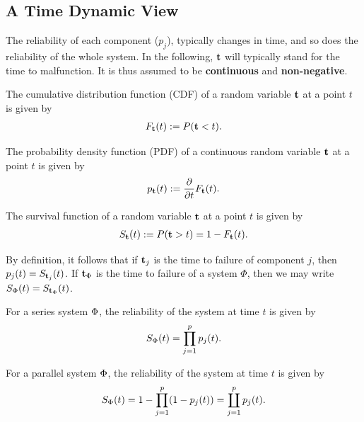 \subsection{A Time Dynamic View}
The reliability of each component ($p_j$), typically changes in time, and so does the reliability of the whole system.
In the following, $\mathbf{t}$ will typically stand for the time to malfunction. It is thus assumed to be \textbf{continuous} and \textbf{non-negative}.


\begin{definition}[CDF]
The cumulative distribution function (CDF) of a random variable $\mathbf{t}$ at a point $t$  is given by
\begin{align}
	F_{\mathbf{t}} (t):= P(\mathbf{t}<t).
\end{align}
\end{definition}

\begin{definition}[PDF]
The probability density function (PDF) of a continuous random variable $\mathbf{t}$ at a point $t$ is given by 
\begin{align}
	p_{\mathbf{t}} (t):= \frac{\partial}{\partial t}F_{\mathbf{t}} (t).
\end{align}
\end{definition}


\begin{definition}
The survival function of a random variable $\mathbf{t}$ at a point $t$ is given by 
\begin{align}
	S_{\mathbf{t}} (t):= P(\mathbf{t}>t)=1-F_{\mathbf{t}} (t).
\end{align}
\end{definition}
By definition, it follows that if $\mathbf{t}_j$ is the time to failure of component $j$, then $p_j(t)=S_{\mathbf{t}_j} (t)$.
If $\mathbf{t}_\Phi$ is the time to failure of a system $\Phi$, then we may write $S_\Phi(t)=S_{\mathbf{t}_\Phi} (t)$.


\begin{example}
For a series system $\Phi$, the reliability of the system at time $t$ is given by $$S_{\Phi} (t)=\prod_{j=1}^{p} p_j(t).$$
\end{example}


\begin{example}
For a parallel system $\Phi$, the reliability of the system at time $t$ is given by $$S_{\Phi} (t)=1- \prod_{j=1}^{p} (1-p_j(t))= \coprod_{j=1}^p p_j(t).$$
\end{example}





